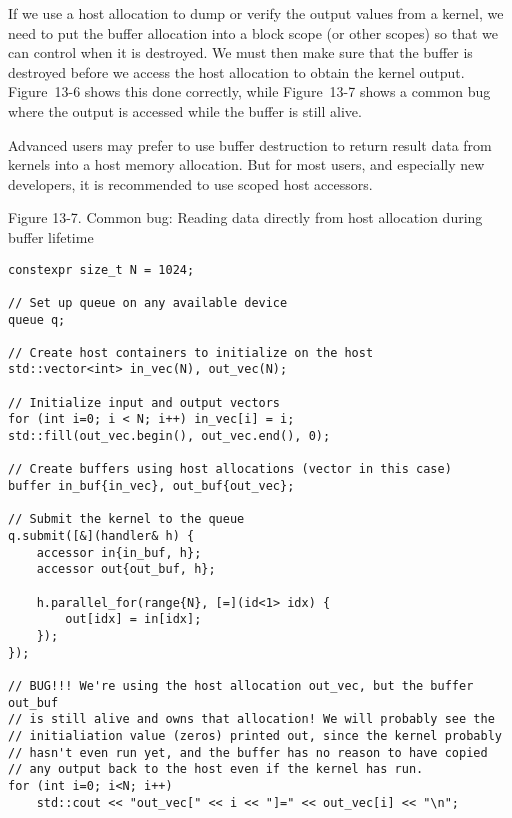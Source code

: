 If we use a host allocation to dump or verify the output values from a kernel, we need to put the buffer allocation into a block scope (or other scopes) so that we can control when it is destroyed. We must then make sure that the buffer is destroyed before we access the host allocation to obtain the kernel output. Figure 13-6 shows this done correctly, while Figure 13-7 shows a common bug where the output is accessed while the buffer is still alive.\par

\begin{tcolorbox}[colback=red!5!white,colframe=red!75!black]
Advanced users may prefer to use buffer destruction to return result data from kernels into a host memory allocation. But for most users, and especially new developers, it is recommended to use scoped host accessors.
\end{tcolorbox}

\hspace*{\fill} \par %
Figure 13-7. Common bug: Reading data directly from host allocation during buffer lifetime
\begin{lstlisting}[caption={}]
constexpr size_t N = 1024;

// Set up queue on any available device
queue q;

// Create host containers to initialize on the host
std::vector<int> in_vec(N), out_vec(N);

// Initialize input and output vectors
for (int i=0; i < N; i++) in_vec[i] = i;
std::fill(out_vec.begin(), out_vec.end(), 0);

// Create buffers using host allocations (vector in this case)
buffer in_buf{in_vec}, out_buf{out_vec};

// Submit the kernel to the queue
q.submit([&](handler& h) {
	accessor in{in_buf, h};
	accessor out{out_buf, h};
	
	h.parallel_for(range{N}, [=](id<1> idx) {
		out[idx] = in[idx];
	});
});

// BUG!!! We're using the host allocation out_vec, but the buffer out_buf
// is still alive and owns that allocation! We will probably see the
// initialiation value (zeros) printed out, since the kernel probably
// hasn't even run yet, and the buffer has no reason to have copied
// any output back to the host even if the kernel has run.
for (int i=0; i<N; i++)
	std::cout << "out_vec[" << i << "]=" << out_vec[i] << "\n";
\end{lstlisting}

